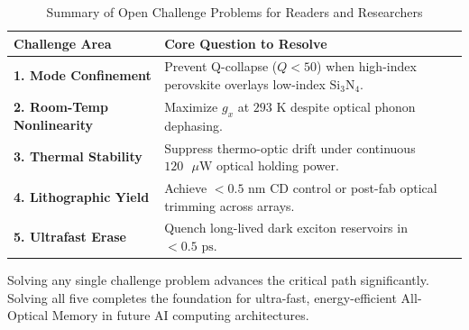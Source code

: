 \documentclass[11pt,a4paper]{article}
\begin{document}
\begin{table}[h!]
\centering
\caption{Summary of Open Challenge Problems for Readers and Researchers}
\label{tab:challenges_full}
\small
\begin{tabular}{lp{5.0cm}}
\toprule
\textbf{Challenge Area} & \textbf{Core Question to Resolve} \\
\midrule
\textbf{1. Mode Confinement} & Prevent Q-collapse ($Q < 50$) when high-index perovskite overlays low-index $\text{Si}_3\text{N}_4$. \\
\textbf{2. Room-Temp Nonlinearity} & Maximize $g_x$ at $293\text{ K}$ despite optical phonon dephasing. \\
\textbf{3. Thermal Stability} & Suppress thermo-optic drift under continuous $120\text{ }\mu\text{W}$ optical holding power. \\
\textbf{4. Lithographic Yield} & Achieve $<0.5\text{ nm}$ CD control or post-fab optical trimming across arrays. \\
\textbf{5. Ultrafast Erase} & Quench long-lived dark exciton reservoirs in $<0.5\text{ ps}$. \\
\bottomrule
\end{tabular}
\end{table}

Solving any single challenge problem advances the critical path significantly. Solving all five completes the foundation for ultra-fast, energy-efficient All-Optical Memory in future AI computing architectures.
\end{document}
